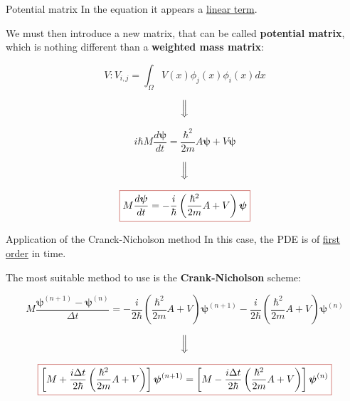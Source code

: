 \begin{frame}{Potential matrix}
    In the equation it appears a \underline{linear term}.

    \pause
    
    We must then introduce a new matrix, that can be called \textcolor{BrickRed}{\textbf{potential matrix}}, which is nothing different than a \textbf{weighted mass matrix}:

    \begin{equation*}
        V:V_{i,j}=\int_\Omega V(x)\phi_j(x)\phi_i(x)dx
    \end{equation*}

    \pause

    \begin{equation*}
        \Big\Downarrow
    \end{equation*}

    \begin{equation*}
        i\hbar M\frac{d\boldsymbol{\psi}}{dt}=\frac{\hbar^2}{2m}A\boldsymbol{\psi}+V\boldsymbol{\psi}
    \end{equation*}

    \pause

    \begin{equation*}
        \Big\Downarrow
    \end{equation*}

    \begin{equation*}
        \fcolorbox{BrickRed}{white}{\text{$\displaystyle M\frac{d\boldsymbol{\psi}}{dt}=-\frac{i}{\hbar}\left(\frac{\hbar^2}{2m}A+V\right)\boldsymbol{\psi}$}}
    \end{equation*}
\end{frame}

\begin{frame}{Application of the Cranck-Nicholson method}
    In this case, the PDE is of \underline{first order} in time.

    \pause

    The most suitable method to use is the \textcolor{BrickRed}{\textbf{Crank-Nicholson}} scheme:

    \begin{equation*}
        M\frac{\boldsymbol{\psi}^{(n+1)}-\boldsymbol{\psi}^{(n)}}{\Delta t}=-\frac{i}{2\hbar}\left(\frac{\hbar^2}{2m}A+V\right)\boldsymbol{\psi}^{(n+1)}-\frac{i}{2\hbar}\left(\frac{\hbar^2}{2m}A+V\right)\boldsymbol{\psi}^{(n)}
    \end{equation*}

    \pause

    \begin{equation*}
        \Big\Downarrow
    \end{equation*}

    \begin{equation*}
        \fcolorbox{BrickRed}{white}{\text{$\displaystyle\left[M+\frac{i\Delta t}{2\hbar}\left(\frac{\hbar^2}{2m}A+V\right)\right]\boldsymbol{\psi}^{(n+1)}=\left[M-\frac{i\Delta t}{2\hbar}\left(\frac{\hbar^2}{2m}A+V\right)\right]\boldsymbol{\psi}^{(n)}$}}
    \end{equation*}
\end{frame}

